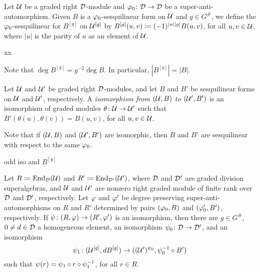 \begin{defi}
    Let $\mathcal U$ be a graded right $\mathcal{D}$-module and $\varphi_0\colon \mathcal{D} \to \mathcal{D}$ be a super-anti-automorphism. 
    Given $B$ is a $\varphi_0$-sesquilinear form on $\mathcal U$ and $g\in G^\#$, we define the $\varphi_0$-sesquilinear for  $B^{[g]}$ on $\mathcal U^{[g]}$ by $B^{[g]}(u,v) \coloneqq (-1)^{|u||g|} B(u,v)$, for all $u,v \in \mathcal U$, where $|u|$ is the parity of $u$ as an element of $\mathcal U$. 
\end{defi}

\begin{lemma}\label{lemma:B^[b]-does-the-job}
    xx
\end{lemma}

Note that $\deg B^{[g]} = g^{-2} \deg B$. 
In particular, $|B^{[g]}| = |B|$.

\begin{defi}
    Let $\mathcal U$ and $\mathcal U'$ be graded right $\mathcal{D}$-modules, and let $B$ and $B'$ be sesquilinear forms on $\mathcal U$ and $\mathcal U'$, respectively. 
    A \emph{isomorphism from $(\mathcal U, B)$ to $(\mathcal U', B')$} is an isomorphism of graded modules $\theta\colon \mathcal U \to \mathcal U'$ such that $B'( \theta(u), \theta(v) ) = B(u, v)$, for all $u,v \in \mathcal U$.
\end{defi}

Note that if $(\mathcal U, B)$ and $(\mathcal U', B')$ are isomorphic, then $B$ and $B'$ are sesquilinear with respect to the same $\varphi_0$. 

\begin{remark}
    odd iso and $B^{[g]}$
\end{remark}

\begin{cor}\label{cor:iso-abstract-vphi}
    Let $R \coloneqq \operatorname{End}_{\mathcal{D}}(\mathcal U)$ and $R' \coloneqq \operatorname{End}_{\mathcal{D}'}(\mathcal U')$, where $\mathcal{D}$ and $\mathcal{D}'$ are graded division superalgebras, and $\mathcal U$ and $\mathcal U'$ are nonzero right graded module of finite rank over $\mathcal{D}$ and $\mathcal{D}'$, respectively. 
    Let $\varphi$ and $\varphi'$ be degree preserving super-anti-automorphisms on $R$ and $R'$ determined by pairs $(\varphi_0, B)$ and $(\varphi_0', B')$, respectively. 
    If $\psi\colon (R, \varphi) \to (R', \varphi')$ is an isomorphism, then there are $g\in G^\#$, $0\neq d\in \mathcal{D}$ a homogeneous element, an isomorphism $\psi_0\colon \mathcal{D} \to \mathcal{D}'$, and an isomorphism
    \begin{equation}\label{eq:iso-B-implies-vphi}
        \psi_1 \colon (\mathcal U^{[g]}, dB^{[g]}) \to ( (\mathcal U')^{\psi_0}, \psi_0^{-1} \circ B' ) 
    \end{equation}
    such that $\psi(r) = \psi_1 \circ r \circ \psi_1^{-1}$, for all $r\in R$.
\end{cor}


